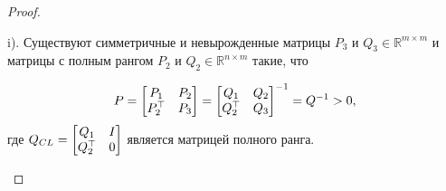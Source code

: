 \begin{proof}
\begin{lemma}
		i). Существуют симметричные и невырожденные матрицы  ${P}_{3}$ и ${Q}_{3} \in \mathbb{R}^{m\times m}$ и матрицы с полным рангом ${P}_{2}$ и ${Q}_{2} \in \mathbb{R}^{n\times m}$ такие, что
		
		\begin{align*}
			{P}=
			\begin{bmatrix} 
				{P}_{1} & {P}_{2}\\ 
				{P}_{2}^\top & {P}_{3} 
			\end{bmatrix} =
			\begin{bmatrix} 
				{Q}_{1} & {Q}_{2} \\ 
				{Q}_{2}^\top & {Q}_{3}
			\end{bmatrix}^{-1}={Q}^{-1}>0,
		\end{align*} 
		где ${Q}_{CL}=
		\begin{bmatrix} 
			{Q}_{1} & {I} \\ {Q}_{2}^\top & 0
		\end{bmatrix}$ является матрицей полного ранга.\\
		

\end{lemma}
\end{proof}
